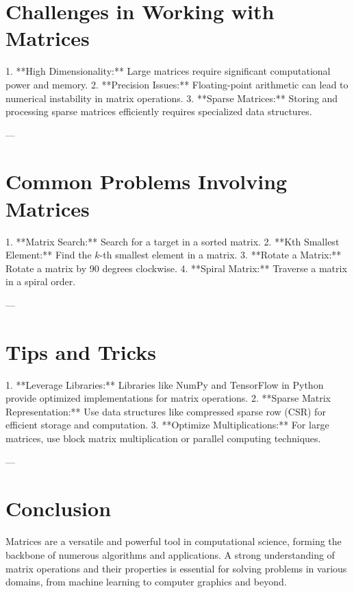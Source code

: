 \section*{Challenges in Working with Matrices}
1. **High Dimensionality:** Large matrices require significant computational power and memory.
2. **Precision Issues:** Floating-point arithmetic can lead to numerical instability in matrix operations.
3. **Sparse Matrices:** Storing and processing sparse matrices efficiently requires specialized data structures.

---

\section*{Common Problems Involving Matrices}
1. **Matrix Search:** Search for a target in a sorted matrix.
2. **Kth Smallest Element:** Find the \(k\)-th smallest element in a matrix.
3. **Rotate a Matrix:** Rotate a matrix by 90 degrees clockwise.
4. **Spiral Matrix:** Traverse a matrix in a spiral order.

---

\section*{Tips and Tricks}
1. **Leverage Libraries:** Libraries like NumPy and TensorFlow in Python provide optimized implementations for matrix operations.
2. **Sparse Matrix Representation:** Use data structures like compressed sparse row (CSR) for efficient storage and computation.
3. **Optimize Multiplications:** For large matrices, use block matrix multiplication or parallel computing techniques.

---

\section*{Conclusion}
Matrices are a versatile and powerful tool in computational science, forming the backbone of numerous algorithms and applications. A strong understanding of matrix operations and their properties is essential for solving problems in various domains, from machine learning to computer graphics and beyond.